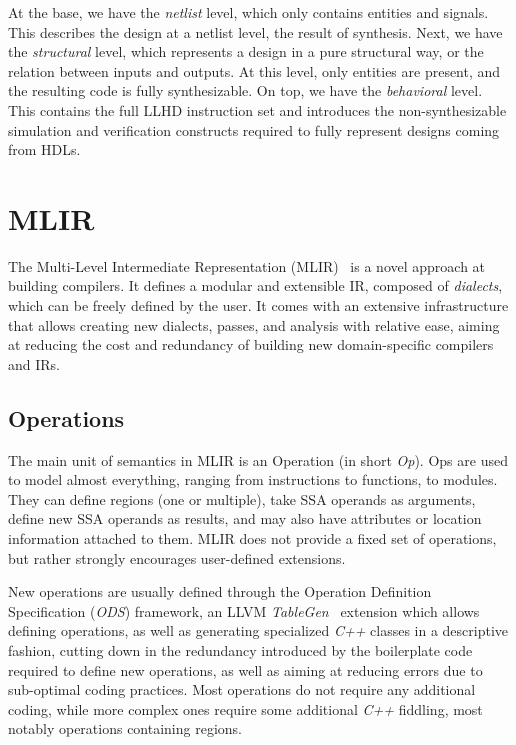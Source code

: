 At the base, we have the \textit{netlist} level, which only contains entities and signals. This describes the design at a netlist level, the result of synthesis. Next, we have the \textit{structural} level, which represents a design in a pure structural way, or the relation between inputs and outputs. At this level, only entities are present, and the resulting code is fully synthesizable. On top, we have the \textit{behavioral} level. This contains the full LLHD instruction set and introduces the non-synthesizable simulation and verification constructs required to fully represent designs coming from HDLs.


\section{MLIR}
\label{section:mlir}
The Multi-Level Intermediate Representation (MLIR)~\cite{Lattner2020, mlir} is a novel approach at building compilers. It defines a modular and extensible IR, composed of \textit{dialects}, which can be freely defined by the user. It comes with an extensive infrastructure that allows creating new dialects, passes, and analysis with relative ease, aiming at reducing the cost and redundancy of building new domain-specific compilers and IRs.


\subsection{Operations}
\label{section:mlir_ops}
The main unit of semantics in MLIR is an Operation (in short \textit{Op}). Ops are used to model almost everything, ranging from instructions to functions, to modules.  They can define regions (one or multiple), take SSA operands as arguments, define new SSA operands as results, and may also have attributes or location information attached to them. MLIR does not provide a fixed set of operations, but rather strongly encourages user-defined extensions.

New operations are usually defined through the Operation Definition Specification (\textit{ODS}) framework, an LLVM \textit{TableGen}~\cite{tablegen} extension which allows defining operations, as well as generating specialized \textit{C++} classes in a descriptive fashion, cutting down in the redundancy introduced by the boilerplate code required to define new operations, as well as aiming at reducing errors due to sub-optimal coding practices. Most operations do not require any additional coding, while more complex ones require some additional \textit{C++} fiddling, most notably operations containing regions.

